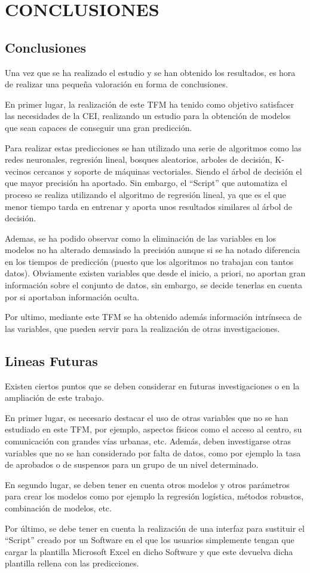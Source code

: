\chapter{CONCLUSIONES}
\section{Conclusiones}
Una vez que se ha realizado el estudio y se han obtenido los resultados, es hora de realizar una pequeña valoración en forma de conclusiones.

En primer lugar, la realización de este TFM ha tenido como objetivo satisfacer las necesidades de la CEI, realizando un estudio para la obtención de modelos que sean capaces de conseguir una gran predicción.

Para realizar estas predicciones se han utilizado una serie de algoritmos como las redes neuronales, regresión lineal, bosques aleatorios, arboles de decisión, K-vecinos cercanos y soporte de máquinas vectoriales. Siendo el árbol de decisión el que mayor precisión ha aportado. Sin embargo, el ``Script'' que automatiza el proceso se realiza utilizando el algoritmo de regresión lineal, ya que es el que menor tiempo tarda en entrenar y aporta unos resultados similares al árbol de decisión.

Ademas, se ha podido observar como la eliminación de las variables en los modelos no ha alterado demasiado la precisión aunque si se ha notado diferencia en los tiempos de predicción (puesto que los algoritmos no trabajan con tantos datos). Obviamente existen variables que desde el inicio, a priori, no aportan gran información sobre el conjunto de datos, sin embargo, se decide tenerlas en cuenta por si aportaban información oculta.

Por ultimo, mediante este TFM se ha obtenido además información intrínseca de las variables, que pueden servir para la realización de otras investigaciones.


\section{Lineas Futuras}
Existen ciertos puntos que se deben considerar en futuras investigaciones o en la ampliación de este trabajo.

En primer lugar, es necesario destacar el uso de otras variables que no se han estudiado en este TFM, por ejemplo, aspectos físicos como el acceso al centro, su comunicación con grandes vías urbanas, etc. Además, deben investigarse otras variables que no se han considerado por falta de datos, como por ejemplo la tasa de aprobados o de suspensos para un grupo de un nivel determinado.

En segundo lugar, se deben tener en cuenta otros modelos y otros parámetros para crear los modelos como por ejemplo la regresión logística, métodos robustos, combinación de modelos, etc.

Por último, se debe tener en cuenta la realización de una interfaz para sustituir el ``Script'' creado por un Software en el que los usuarios simplemente tengan que cargar la plantilla Microsoft Excel en dicho Software y que este devuelva dicha plantilla rellena con las predicciones.
